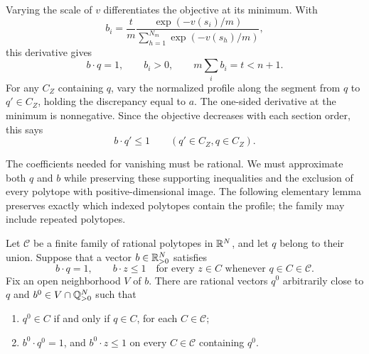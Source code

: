 Varying the scale of \(v\) differentiates the objective at its
minimum.  With
\begin{equation}
 b_i=\frac{t}{m}
       \frac{\exp(-v(s_i)/m)}{\sum_{h=1}^{N_m}\exp(-v(s_h)/m)},
 \label{eq:supporting-functional}
\end{equation}
this derivative gives
\begin{equation}
 b\cdot q=1,
 \qquad b_i>0,
 \qquad m\sum_i b_i=t<n+1.
 \label{eq:supporting-budget}
\end{equation}
For any \(C_Z\) containing \(q\), vary the normalized profile along
the segment from \(q\) to \(q'\in C_Z\), holding the discrepancy
equal to \(a\).  The one-sided derivative at the minimum is
nonnegative.  Since the objective decreases with each section order,
this says
\begin{equation}
 b\cdot q'\leq1\qquad(q'\in C_Z, q\in C_Z).
 \label{eq:supporting-inequality}
\end{equation}

The coefficients needed for vanishing must be rational. We must
approximate both $q$ and $b$ while preserving these supporting
inequalities and the exclusion of every polytope with
positive-dimensional image. The following elementary lemma preserves
exactly which indexed polytopes contain the profile; the family may
include repeated polytopes.

\begin{lemma}
\label{lem:rational-support}
Let \(\mathcal C\) be a finite family of rational polytopes in
\(\mathbb R^N\), and let \(q\) belong to their union.  Suppose that a vector
\(b\in\mathbb R_{>0}^N\) satisfies
\[
 b\cdot q=1,
 \qquad b\cdot z\leq 1
 \quad\text{for every }z\in C\text{ whenever }q\in C\in\mathcal C.
\]
Fix an open neighborhood \(V\) of \(b\).  There are rational vectors
\(q^0\) arbitrarily close to \(q\) and
\(b^0\in V\cap\mathbb Q_{>0}^N\) such that
\begin{enumerate}
\item \(q^0\in C\) if and only if \(q\in C\), for each
      \(C\in\mathcal C\);
\item \(b^0\cdot q^0=1\), and \(b^0\cdot z\leq1\) on every
      \(C\in\mathcal C\) containing \(q^0\).
\end{enumerate}
\end{lemma}

